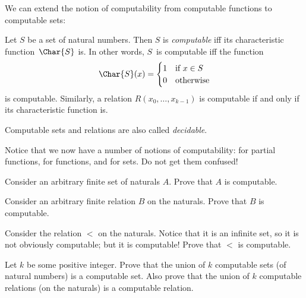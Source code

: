 \documentclass[../../../include/open-logic-section]{subfiles}
\begin{document}

We can extend the notion of computability from computable functions to
computable sets:

\begin{defn}
  Let $S$ be a set of natural numbers. Then $S$ is \emph{computable}
  iff its characteristic function~$\Char{S}$ is. In other words,
  $S$~is computable iff the function
\[
\Char{S}(x) =
\begin{cases}
1 & \text{if $x \in S$} \\
0 & \text{otherwise}
\end{cases}
\]
is computable. Similarly, a relation $R(x_0, \dots, x_{k-1})$ is
computable if and only if its characteristic function is.

Computable sets and relations are also called \emph{decidable}.
\end{defn}

\begin{explain}
Notice that we now have a number of notions of computability: for
partial functions, for functions, and for sets. Do not get them
confused!{} 
\end{explain}

\begin{prob}
  Consider an arbitrary finite set of naturals $A$. Prove that $A$ is computable.
\end{prob}

\begin{prob}
  Consider an arbitrary finite relation $B$ on the naturals. Prove that $B$ is computable.
\end{prob}

\begin{prob}
  Consider the relation $<$ on the naturals. Notice that it is an infinite set, so it is not obviously computable; but it is computable! Prove that $<$ is computable.
\end{prob}

\begin{prob}
  Let $k$ be some positive integer. Prove that the union of $k$ computable sets (of natural numbers) is a computable set. Also prove that the union of $k$ computable relations (on the naturals) is a computable relation.
\end{prob}
\end{document}

